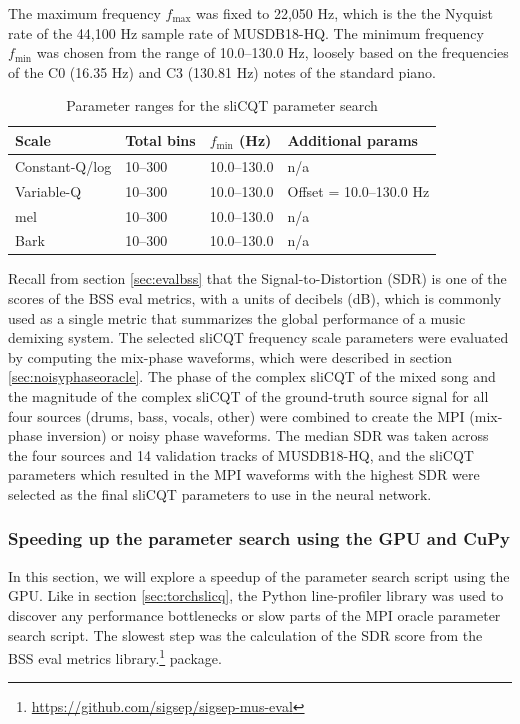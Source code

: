 \documentclass[report.tex]{subfiles}
\begin{document}
The maximum frequency $f_{\text{max}}$ was fixed to 22,050 Hz, which is the the Nyquist rate of the 44,100 Hz sample rate of MUSDB18-HQ. The minimum frequency $f_{\text{min}}$ was chosen from the range of 10.0--130.0 Hz, loosely based on the frequencies of the C0 (16.35 Hz) and C3 (130.81 Hz) notes of the standard piano.

\begin{table}[ht]
	\centering
	\caption{Parameter ranges for the sliCQT parameter search}
	\label{table:slicqparams}
\begin{tabular}{ |l|l|l|l| }
	 \hline
	 Scale & Total bins & $f_{\text{min}}$ (Hz) & Additional params \\
	 \hline
	 \hline
	 Constant-Q/log & 10--300 & 10.0--130.0 & n/a \\
	 \hline
	 Variable-Q & 10--300 & 10.0--130.0 & Offset = 10.0--130.0 Hz \\
	 \hline
	 mel & 10--300 & 10.0--130.0 & n/a \\
	 \hline
	 Bark & 10--300 & 10.0--130.0 & n/a \\
	 \hline
\end{tabular}
\end{table}

Recall from section \ref{sec:evalbss} that the Signal-to-Distortion (SDR) is one of the scores of the BSS eval metrics, with a units of decibels (dB), which is commonly used as a single metric that summarizes the global performance of a music demixing system. The selected sliCQT frequency scale parameters were evaluated by computing the mix-phase waveforms, which were described in section \ref{sec:noisyphaseoracle}. The phase of the complex sliCQT of the mixed song and the magnitude of the complex sliCQT of the ground-truth source signal for all four sources (drums, bass, vocals, other) were combined to create the MPI (mix-phase inversion) or noisy phase waveforms. The median SDR was taken across the four sources and 14 validation tracks of MUSDB18-HQ, and the sliCQT parameters which resulted in the MPI waveforms with the highest SDR were selected as the final sliCQT parameters to use in the neural network.

\subsubsection{Speeding up the parameter search using the GPU and CuPy}
\label{sec:fasterbsscupy}

In this section, we will explore a speedup of the parameter search script using the GPU. Like in section \ref{sec:torchslicq}, the Python line-profiler library was used to discover any performance bottlenecks or slow parts of the MPI oracle parameter search script. The slowest step was the calculation of the SDR score from the BSS eval metrics library.\footnote{\url{https://github.com/sigsep/sigsep-mus-eval}} package.
\end{document}
